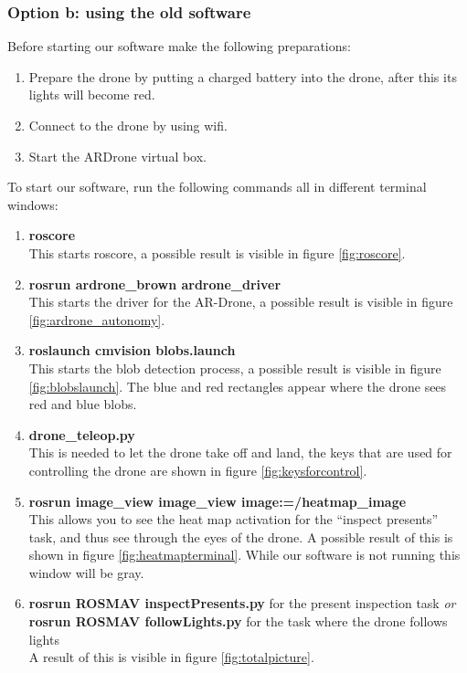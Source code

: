 \documentclass[a4paper,10pt]{article}
\begin{document}
\subsubsection{Option b: using the old software}
Before starting our software make the following preparations: 
\begin{enumerate}
	\item Prepare the drone by putting a charged battery into the drone, after this its lights will become red.
	\item Connect to the drone by using wifi. 
	\item Start the ARDrone virtual box.  
\end{enumerate}
To start our software, run the following commands all in different terminal windows:
\begin{enumerate}
\item \textbf{roscore} \\ This starts roscore, a possible result is visible in figure \ref{fig:roscore}.
\item \textbf{rosrun ardrone\_brown ardrone\_driver} \\ This starts the driver for the AR-Drone, a possible result is visible in figure \ref{fig:ardrone_autonomy}.
\item \textbf{roslaunch cmvision blobs.launch} \\ This starts the blob detection process, a possible result is visible in figure \ref{fig:blobslaunch}. The blue and red rectangles appear where the drone sees red and blue blobs. 
\item \textbf{drone\_teleop.py}  \\ This is needed to let the drone take off and land, the keys that are used for controlling the drone are shown in figure \ref{fig:keysforcontrol}.
\item \textbf{rosrun image\_view image\_view image:=/heatmap\_image} \\ This
      allows you to see the heat map activation for the ``inspect presents''
      task, and thus see through the eyes of the drone. A possible result of this is shown in figure \ref{fig:heatmapterminal}. While our software is not running this window will be gray. 
\item \textbf{rosrun ROSMAV inspectPresents.py} for the present inspection task \textit{or} \\
      \textbf{rosrun ROSMAV followLights.py} for the task where the drone follows lights\\
      A result of this is visible in figure \ref{fig:totalpicture}.
\end{enumerate}
\end{document}

